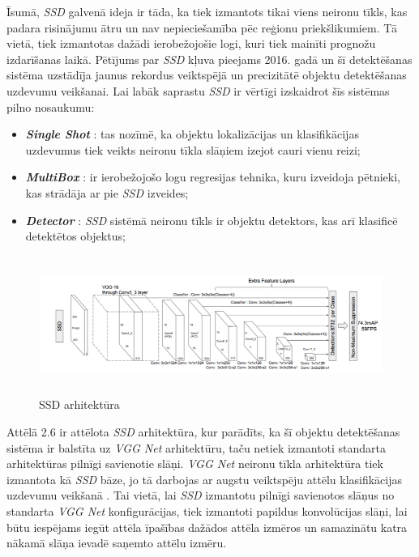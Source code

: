 Īsumā, \textit{SSD} galvenā ideja ir tāda, ka tiek izmantots tikai viens neironu tīkls, kas padara risinājumu ātru un nav nepieciešamība pēc reģionu priekšlikumiem. Tā vietā, tiek izmantotas dažādi ierobežojošie logi, kuri tiek mainīti prognožu izdarīšanas laikā. Pētījums par \textit{SSD} kļuva pieejams 2016. gadā \cite{liu2016ssd} un šī detektēšanas sistēma uzstādīja jaunus rekordus veiktspējā un precizitātē objektu detektēšanas uzdevumu veikšanai. Lai labāk saprastu \textit{SSD} ir vērtīgi izskaidrot šīs sistēmas pilno nosaukumu:
\begin{itemize}
	\item \textit{\textbf{Single Shot}} : tas nozīmē, ka objektu lokalizācijas un klasifikācijas uzdevumus tiek veikts neironu tīkla slāņiem izejot cauri vienu reizi;
	\item \textit{\textbf{MultiBox}} : ir ierobežojošo logu regresijas tehnika, kuru izveidoja pētnieki, kas strādāja ar pie \textit{SSD} izveides;
	\item  \textit{\textbf{Detector}} : \textit{SSD} sistēmā neironu tīkls ir objektu detektors, kas arī klasificē detektētos objektus;
\end{itemize}
\newpage
\begin{figure}[h]%
	\centering
	\includegraphics[height=4.5cm]{images/ssdarch.png} %
	\caption{SSD arhitektūra \cite{ssdarch}}%
	\label{fig:example}%
\end{figure}

Attēlā 2.6 ir attēlota \textit{SSD} arhitektūra, kur parādīts, ka šī objektu detektēšanas sistēma ir balstīta uz \textit{VGG Net} arhitektūru, taču netiek izmantoti standarta arhitektūras pilnīgi savienotie slāņi. \textit{VGG Net} neironu tīkla arhitektūra tiek izmantota kā \textit{SSD} bāze, jo tā darbojas ar augstu veiktspēju attēlu klasifikācijas uzdevumu veikšanā \cite{simonyan2014very}. Tai vietā, lai \textit{SSD} izmantotu pilnīgi savienotos slāņus no standarta \textit{VGG Net} konfigurācijas, tiek izmantoti papildus konvolūcijas slāņi, lai būtu iespējams iegūt attēla īpašības dažādos attēla izmēros un samazinātu katra nākamā slāņa ievadē saņemto attēlu izmēru. 

